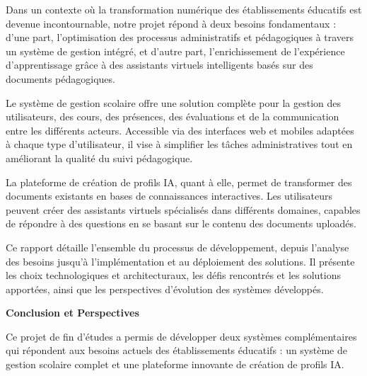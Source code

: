 \documentclass[12pt, a4paper]{report}
\begin{document}
Dans un contexte où la transformation numérique des établissements éducatifs est devenue incontournable, notre projet répond à deux besoins fondamentaux : d'une part, l'optimisation des processus administratifs et pédagogiques à travers un système de gestion intégré, et d'autre part, l'enrichissement de l'expérience d'apprentissage grâce à des assistants virtuels intelligents basés sur des documents pédagogiques.

Le système de gestion scolaire offre une solution complète pour la gestion des utilisateurs, des cours, des présences, des évaluations et de la communication entre les différents acteurs. Accessible via des interfaces web et mobiles adaptées à chaque type d'utilisateur, il vise à simplifier les tâches administratives tout en améliorant la qualité du suivi pédagogique.

La plateforme de création de profils IA, quant à elle, permet de transformer des documents existants en bases de connaissances interactives. Les utilisateurs peuvent créer des assistants virtuels spécialisés dans différents domaines, capables de répondre à des questions en se basant sur le contenu des documents uploadés.

Ce rapport détaille l'ensemble du processus de développement, depuis l'analyse des besoins jusqu'à l'implémentation et au déploiement des solutions. Il présente les choix technologiques et architecturaux, les défis rencontrés et les solutions apportées, ainsi que les perspectives d'évolution des systèmes développés.





\makeatletter
\newcommand{\conclusionchapter}[1]{%
  \clearpage
  \vspace*{10pt}%
  {\parindent \z@ \raggedright \normalfont
   \Huge \bfseries \color{primary} #1\par\nobreak
   \vskip 20pt%
  }
  \thispagestyle{fancy}%
}
\makeatother

\conclusionchapter{Conclusion et Perspectives}
\setcounter{section}{0}

Ce projet de fin d'études a permis de développer deux systèmes complémentaires qui répondent aux besoins actuels des établissements éducatifs : un système de gestion scolaire complet et une plateforme innovante de création de profils IA.
\end{document}
